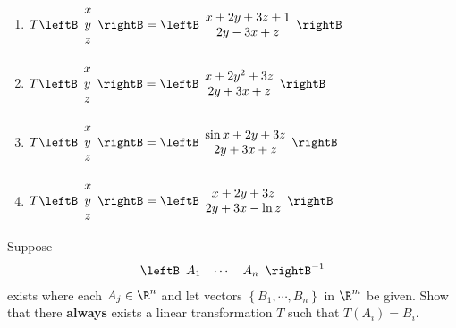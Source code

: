 \begin{enumialphparenastyle}
\begin{ex}
\begin{enumerate}
\item $T\leftB
\begin{array}{c}
x \\
y \\
z
\end{array}
\rightB =\leftB
\begin{array}{c}
x+2y+3z+1 \\
2y-3x+z
\end{array}
\rightB $

\item $T\leftB
\begin{array}{c}
x \\
y \\
z
\end{array}
\rightB =\leftB
\begin{array}{c}
x+2y^{2}+3z \\
2y+3x+z
\end{array}
\rightB $

\item $T\leftB
\begin{array}{c}
x \\
y \\
z
\end{array}
\rightB =\leftB
\begin{array}{c}
\sin x+2y+3z \\
2y+3x+z
\end{array}
\rightB $

\item $T\leftB
\begin{array}{c}
x \\
y \\
z
\end{array}
\rightB =\leftB
\begin{array}{c}
x+2y+3z \\
2y+3x-\ln z
\end{array}
\rightB $
\end{enumerate}
\end{ex}


\begin{ex} Suppose 
\begin{equation*}
\leftB
\begin{array}{ccc}
A_{1} & \cdots & A_{n}
\end{array}
\rightB ^{-1}
\end{equation*}
 exists where each $A_{j}\in \R^{n}$ and let
vectors  $\left\{ B_{1},\cdots ,B_{n}\right\} $ in $\R^{m}$ be given. 
Show that there \textbf{always }exists a linear
transformation $T$ such that $T(A_{i})=B_{i}$.
\end{ex}



\end{enumialphparenastyle}

